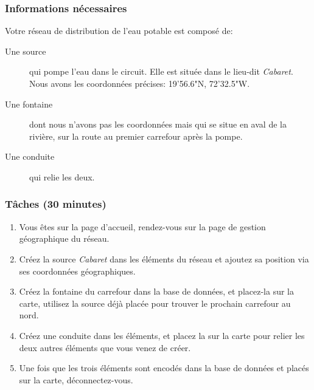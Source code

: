 \documentclass[a4paper, 11pt]{article}
\begin{document}
    \subsubsection*{Informations nécessaires}
        Votre réseau de distribution de l'eau potable est composé de:
        \begin{description}
            \item[Une source] qui pompe l'eau dans le circuit. Elle est située dans le lieu-dit \emph{Cabaret}. Nous avons les coordonnées précises: 19'56.6"N, 72'32.5"W.
            \item[Une fontaine] dont nous n'avons pas les coordonnées mais qui se situe en aval de la rivière, sur la route au premier carrefour après la pompe.
            \item[Une conduite] qui relie les deux.
        \end{description}

    \subsubsection*{Tâches (30 minutes)}
        \begin{enumerate}
            \item Vous êtes sur la page d'accueil, rendez-vous sur la page de gestion géographique du réseau.
            \item Créez la source \emph{Cabaret} dans les éléments du réseau et ajoutez sa position via ses coordonnées géographiques.
            \item Créez la fontaine du carrefour dans la base de données, et placez-la sur la carte, utilisez la source déjà placée pour trouver le prochain carrefour au nord.
            \item Créez une conduite dans les éléments, et placez la sur la carte pour relier les deux autres éléments que vous venez de créer.
            \item Une fois que les trois éléments sont encodés dans la base de données et placés sur la carte, déconnectez-vous.
        \end{enumerate}

\newpage
\end{document}

